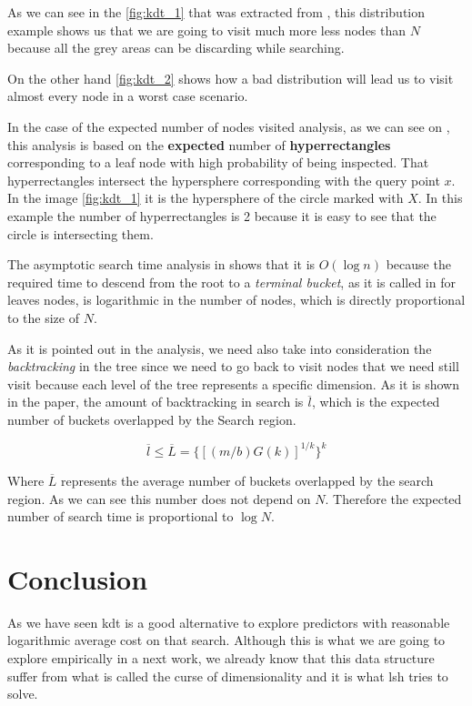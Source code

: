 \documentclass[12pt, a4paper]{article}
\begin{document}
As we can see in the \ref{fig:kdt_1} that was extracted from \cite{moore_phd}, this distribution example shows us that we are going to visit much more less nodes than $N$ because all the grey areas can be discarding while searching.

On the other hand \ref{fig:kdt_2} shows how a bad distribution will lead us to visit almost every node in a worst case scenario.

In the case of the expected number of nodes visited analysis, as we can see on \cite{fried}, this analysis is based on the \textbf{expected} number of \textbf{hyperrectangles} corresponding to a leaf node with high probability of being inspected. That hyperrectangles intersect the hypersphere corresponding with the query point $x$. In the image \ref{fig:kdt_1} it is the hypersphere of the circle marked with $X$. In this example the number of hyperrectangles is 2 because it is easy to see that the circle is intersecting them.

The asymptotic search time analysis in \cite{fried} shows that it is $O(\log{n})$ because the required time to descend from the root to a \textit{terminal bucket}, as it is called in \cite{fried} for leaves nodes, is logarithmic in the number of nodes, which is directly proportional to the size of $N$.

As it is pointed out in the analysis, we need also take into consideration the \textit{backtracking} in the tree since we need to go back to visit nodes that we need still visit because each level of the tree represents a specific dimension. As it is shown in the paper, the amount of backtracking in search is $\overline{l}$, which is the expected number of buckets overlapped by the Search region.

\begin{equation*}
\overline{l} \leq \overline{L} = \{[(m/b)G(k)]^{1/k}\}^k
\end{equation*}

Where $\overline{L}$ represents the average number of buckets overlapped by the search region. As we can see this number does not depend on $N$. Therefore the expected number of search time is proportional to $\log{N}$.


\section{Conclusion}
As we have seen \acrshort{kdt} is a good alternative to explore predictors with reasonable logarithmic average cost on that search.
Although this is what we are going to explore empirically in a next work, we already know that this data structure suffer from what is called the curse of dimensionality and it is what \acrshort{lsh} tries to solve.





\printglossaries
\end{document}

